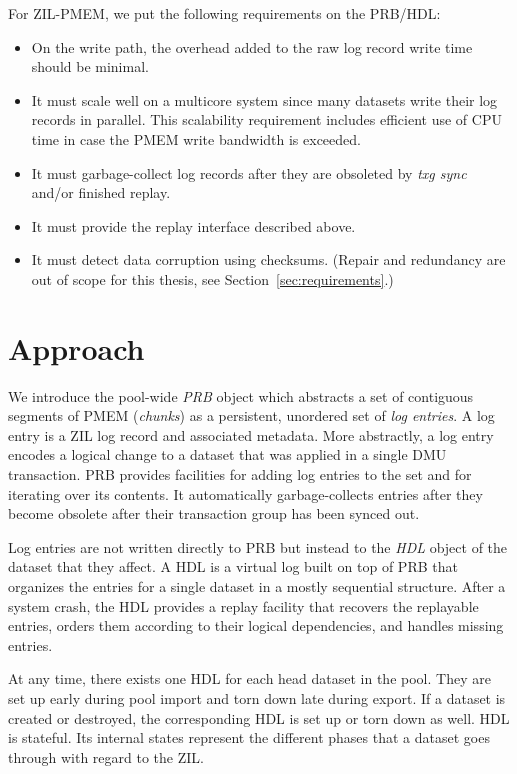 \documentclass[12pt,a4paper,twoside]{book}
\begin{document}
For ZIL-PMEM, we put the following requirements on the PRB/HDL:
\begin{itemize}[noitemsep,beginpenalty=100000,midpenalty=100000]
    \item On the write path, the overhead added to the raw log record write time should be minimal.
    \item It must scale well on a multicore system since many datasets write their log records in parallel.
        This scalability requirement includes efficient use of CPU time in case the PMEM write bandwidth is exceeded.
    \item It must garbage-collect log records after they are obsoleted by \textit{txg sync} and/or finished replay.
    \item It must provide the replay interface described above.
    \item It must detect data corruption using checksums. (Repair and redundancy are out of scope for this thesis, see Section~\ref{sec:requirements}.)
\end{itemize}

\section{Approach}\label{di:prb:approach}
We introduce the pool-wide \textit{PRB} object which abstracts a set of contiguous segments of PMEM (\textit{chunks}) as a persistent, unordered set of \textit{log entries}.
A log entry is a ZIL log record and associated metadata.
More abstractly, a log entry encodes a logical change to a dataset that was applied in a single DMU transaction.
PRB provides facilities for adding log entries to the set and for iterating over its contents.
It automatically garbage-collects entries after they become obsolete after their transaction group has been synced out.

Log entries are not written directly to PRB but instead to the \textit{HDL} object of the dataset that they affect.
A HDL is a virtual log built on top of PRB that organizes the entries for a single dataset in a mostly sequential structure.
After a system crash, the HDL provides a replay facility that recovers the replayable entries, orders them according to their logical dependencies, and handles missing entries.

At any time, there exists one HDL for each head dataset in the pool.
They are set up early during pool import and torn down late during export.
If a dataset is created or destroyed, the corresponding HDL is set up or torn down as well.
HDL is stateful.
Its internal states represent the different phases that a dataset goes through with regard to the ZIL.
\end{document}
